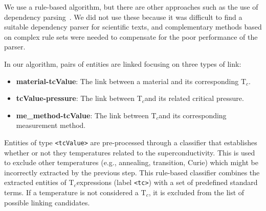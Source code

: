 \documentclass[]{interact}
\theoremstyle{plain}%
\theoremstyle{definition}
\theoremstyle{remark}
\newcommand{\tc}{T$_{c}$}
\begin{document}
We use a rule-based algorithm, but there are other approaches such as the use of dependency parsing~\cite{yoshikawa:2017acl, Tiktinsky2020pyBARTES, swayamdipta:17, zhou-zhao-2019-head}. We did not use these because it was difficult to find a suitable dependency parser for scientific texts, and complementary methods based on complex rule sets were needed to compensate for the poor performance of the parser.

In our algorithm, pairs of entities are linked focusing on three types of link:
\begin{itemize}
    \item \textbf{material-tcValue}: The link between a material and its corresponding \tc.
    \item \textbf{tcValue-pressure}: The link between \tc and its related critical pressure.
    \item \textbf{me\_method-tcValue}: The link between \tc and its corresponding measurement method.
\end{itemize}

Entities of type \texttt{<tcValue>} are pre-processed through a classifier that establishes whether or not they temperatures related to the superconductivity. This is used to exclude other temperatures (e.g., annealing, transition, Curie) which might be incorrectly extracted by the previous step.
This rule-based classifier combines the extracted entities of \tc expressions (label \texttt{<tc>}) with a set of predefined standard terms.
If a temperature is not considered a \tc, it is excluded from the list of possible linking candidates.
\end{document}

